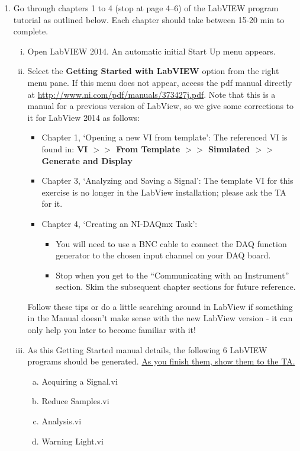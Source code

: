 \documentclass[12pt]{article}
\begin{document}
\begin{enumerate}[1.]
	\item Go through chapters 1 to 4 (stop at page 4--6) of the LabVIEW program tutorial as outlined below. Each chapter should take between 15-20 min to complete.
	\begin{enumerate}[i.]
		\item Open LabVIEW 2014. An automatic initial Start Up menu appears.
		\item Select the \textbf{Getting Started with LabVIEW} option from the right menu pane. If this menu does not appear, access the pdf manual directly at \url{http://www.ni.com/pdf/manuals/373427j.pdf}. 
		Note that this is a manual for a previous version of LabView, so we give some corrections to it for LabView 2014 as follows: 
			\begin{itemize}
				\item Chapter 1, `Opening a new VI from template': The referenced VI is found in: {\bf{ VI $>>$ From Template $>>$ Simulated $>>$ Generate and Display}}
				\item Chapter 3, `Analyzing and Saving a Signal': The template VI for this exercise is no longer in the LabView installation; please ask the TA for it.
				\item Chapter 4, `Creating an NI-DAQmx Task': 
					\begin{itemize}
						\item You will need to use a BNC cable to connect the DAQ function generator to the chosen input channel on your DAQ board.
						\item Stop when you get to the ``Communicating with an Instrument'' section. 
						Skim the subsequent chapter sections for future reference. 
					\end{itemize}
			\end{itemize}
		Follow these tips or do a little searching around in LabView if something in the Manual doesn't make sense with the new LabView version - it can only help you later to become familiar with it!
		\item As this Getting Started manual details, the following 6 LabVIEW programs should
be generated. \underline{As you finish them, show them to the TA.}
		\begin{enumerate}[a.]
			\item Acquiring a Signal.vi
			\item Reduce Samples.vi
			\item Analysis.vi
			\item Warning Light.vi

\end{enumerate}
\end{enumerate}
\end{enumerate}
\end{document}

